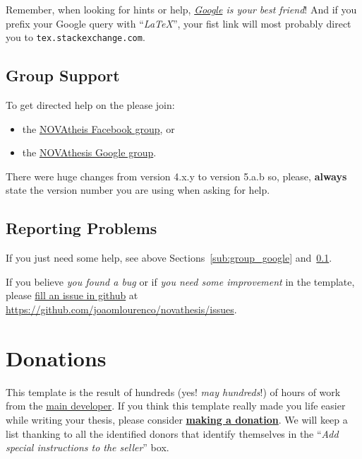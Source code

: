 Remember, when looking for hints or help, \emph{\href{google.com}{Google} is your best friend}!   And if you prefix your Google query with “\emph{LaTeX}”, your fist link will most probably direct you to \texttt{tex.stackexchange.com}.

\subsection{Group Support}
\label{sub:group_support}

To get directed help on the  please join:
\begin{itemize}
  \item the \href{https://www.facebook.com/groups/novathesis}{NOVAtheis Facebook group}, or
  \item the \href{https://groups.google.com/forum/#!forum/novathesis}{NOVAthesis Google group}.
\end{itemize}

There were huge changes from version 4.x.y to version 5.a.b so, please, \textbf{always} state the version number you are using when asking for help.

\subsection{Reporting Problems}
\label{sub:reporting_problems}

If you just need some help, see above Sections~\ref{sub:group_google} and~\ref{sub:group_support}.

If you believe \emph{you found a bug} or if \emph{you need some improvement} in the template, please \href{https://github.com/joaomlourenco/novathesis/issues}{fill an issue in github} at \url{https://github.com/joaomlourenco/novathesis/issues}.


\section{Donations}
\label{sec:donations}

This template is the result of hundreds (yes! \emph{may hundreds}!) of hours of work from the \href{https://docentes.fct.unl.pt/joao-lourenco}{main developer}.  If you think this template really made you life easier while writing your thesis, please consider \href{https://paypal.me/novathesis}{\textbf{making a donation}}. We will keep a list thanking to all the identified donors that identify themselves in the “\emph{Add special instructions to the seller}” box.

